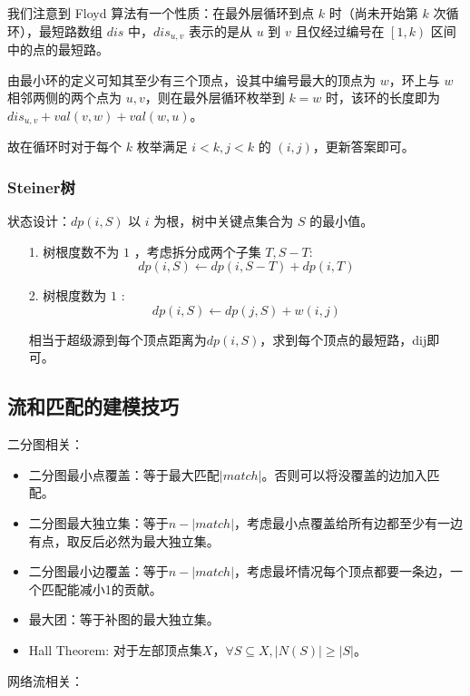 \documentclass[twoside]{article}
\begin{document}
我们注意到 Floyd 算法有一个性质：在最外层循环到点 $k$ 时（尚未开始第 $k$ 次循环），最短路数组 $dis$ 中，$dis_{u,v}$ 表示的是从 $u$ 到 $v$ 且仅经过编号在 $\left[1, k\right)$ 区间中的点的最短路。

由最小环的定义可知其至少有三个顶点，设其中编号最大的顶点为 $w$，环上与 $w$ 相邻两侧的两个点为 $u,v$，则在最外层循环枚举到 $k=w$ 时，该环的长度即为 $dis_{u,v}+val\left(v,w\right)+val\left(w,u\right)$。

故在循环时对于每个 $k$ 枚举满足 $i<k,j<k$ 的 $(i,j)$，更新答案即可。\subsubsection{Steiner树}
状态设计：$dp(i,S)$ 以 $i$ 为根，树中关键点集合为 $S$ 的最小值。

\begin{enumerate}
    \item[1.] 树根度数不为 $1$ ，考虑拆分成两个子集 $T,S-T$:
    $$ dp(i,S) \gets dp(i,S-T)+dp(i,T) $$
    \item[2.] 树根度数为 $1$ :
    $$ dp(i,S) \gets dp(j,S)+w(i,j) $$

    相当于超级源到每个顶点距离为$dp(i,S)$，求到每个顶点的最短路，dij即可。
\end{enumerate}
\subsection{流和匹配的建模技巧}
二分图相关：
\begin{itemize}
    \item 二分图最小点覆盖：等于最大匹配$|match|$。否则可以将没覆盖的边加入匹配。
    \item 二分图最大独立集：等于$n-|match|$，考虑最小点覆盖给所有边都至少有一边有点，取反后必然为最大独立集。
    \item 二分图最小边覆盖：等于$n-|match|$，考虑最坏情况每个顶点都要一条边，一个匹配能减小1的贡献。
    \item 最大团：等于补图的最大独立集。
    \item Hall Theorem: 对于左部顶点集$X$，$\forall S\subseteq X, |N(S)|\ge |S|$。
\end{itemize}

网络流相关：
\end{document}
